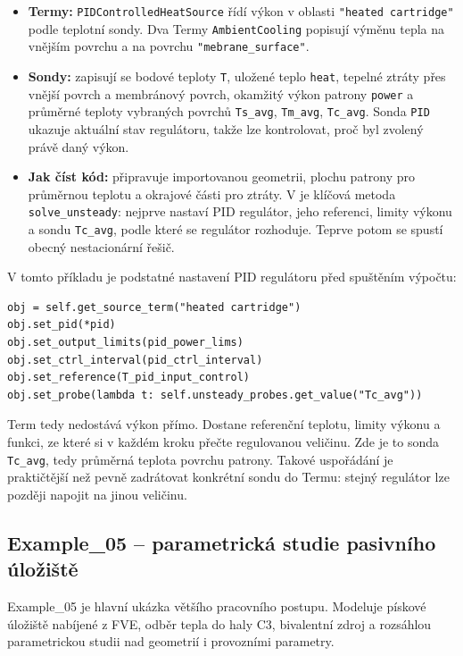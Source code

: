 \documentclass[a4paper,11pt]{article}
\begin{document}
\begin{itemize}
  \item \textbf{Termy:} \texttt{PIDControlledHeatSource} řídí výkon v oblasti
        \texttt{"heated cartridge"} podle teplotní sondy. Dva Termy
        \texttt{AmbientCooling} popisují výměnu tepla na vnějším povrchu a na
        povrchu \texttt{"mebrane\_surface"}.
  \item \textbf{Sondy:} zapisují se bodové teploty \texttt{T}, uložené teplo
        \texttt{heat}, tepelné ztráty přes vnější povrch a membránový povrch,
        okamžitý výkon patrony \texttt{power} a průměrné teploty vybraných
        povrchů \texttt{Ts\_avg}, \texttt{Tm\_avg}, \texttt{Tc\_avg}. Sonda
        \texttt{PID} ukazuje aktuální stav regulátoru, takže lze kontrolovat,
        proč byl zvolený právě daný výkon.
  \item \textbf{Jak číst kód:}  připravuje importovanou
        geometrii, plochu patrony pro průměrnou teplotu a okrajové části pro
        ztráty. V  je klíčová metoda \texttt{solve\_unsteady}:
        nejprve nastaví PID regulátor, jeho referenci, limity výkonu a sondu
        \texttt{Tc\_avg}, podle které se regulátor rozhoduje. Teprve potom se
        spustí obecný nestacionární řešič.
\end{itemize}

V tomto příkladu je podstatné nastavení PID regulátoru před spuštěním výpočtu:

\begin{lstlisting}[style=py]
obj = self.get_source_term("heated cartridge")
obj.set_pid(*pid)
obj.set_output_limits(pid_power_lims)
obj.set_ctrl_interval(pid_ctrl_interval)
obj.set_reference(T_pid_input_control)
obj.set_probe(lambda t: self.unsteady_probes.get_value("Tc_avg"))
\end{lstlisting}

Term tedy nedostává výkon přímo. Dostane referenční teplotu, limity výkonu a
funkci, ze které si v každém kroku přečte regulovanou veličinu. Zde je to sonda
\texttt{Tc\_avg}, tedy průměrná teplota povrchu patrony. Takové uspořádání je
praktičtější než pevně zadrátovat konkrétní sondu do Termu: stejný regulátor lze
později napojit na jinou veličinu.

\subsection*{Example\_05 -- parametrická studie pasivního úložiště}

Example\_05 je hlavní ukázka většího pracovního postupu. Modeluje pískové
úložiště nabíjené z FVE, odběr tepla do haly C3, bivalentní zdroj a rozsáhlou
parametrickou studii nad geometrií i provozními parametry.
\end{document}
